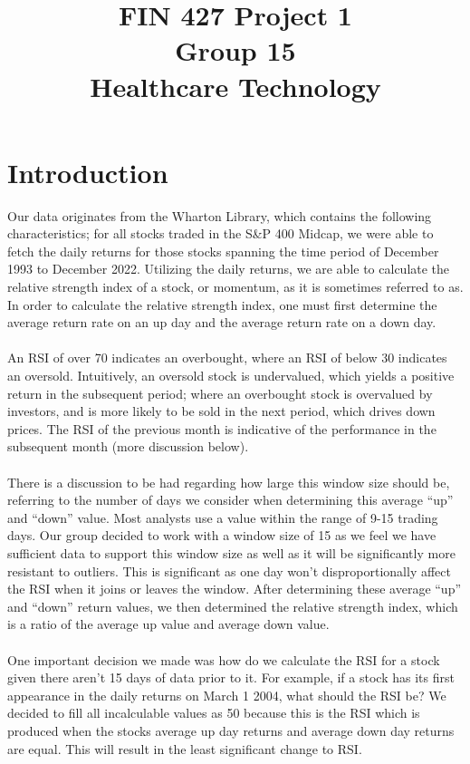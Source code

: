 \documentclass{article}
\title{\textbf{FIN 427 Project 1 \\ Group 15 \\ Healthcare Technology}}
\author{}
\begin{document}
\maketitle 
\newcommand{\sectionbreak}{\clearpage}
\tableofcontents
\section{Introduction}
Our data originates from the Wharton Library, which contains the following characteristics; for all stocks traded in the S\&P 400 Midcap, we were able to fetch the daily returns for those stocks spanning the time period of December 1993 to December 2022. Utilizing the daily returns, we are able to calculate the relative strength index of a stock, or momentum, as it is sometimes referred to as. In order to calculate the relative strength index, one must first determine the average return rate on an up day and the average return rate on a down day.  
\\~\\ An RSI of over 70 indicates an overbought, where an RSI of below 30 indicates an oversold. Intuitively, an oversold stock is undervalued, which yields a positive return in the subsequent period; where an overbought stock is overvalued by investors, and is more likely to be sold in the next period, which drives down prices. The RSI of the previous month is indicative of the performance in the subsequent month (more discussion below). 
\\~\\ There is a discussion to be had regarding how large this window size should be, referring to the number of days we consider when determining this average “up” and “down” value. Most analysts use a value within the range of 9-15 trading days. Our group decided to work with a window size of 15 as we feel we have sufficient data to support this window size as well as it will be significantly more resistant to outliers. This is significant as one day won’t disproportionally affect the RSI when it joins or leaves the window. After determining these average “up” and “down” return values, we then determined the relative strength index, which is a ratio of the average up value and average down value. 
\\~\\ One important decision we made was how do we calculate the RSI for a stock given there aren’t 15 days of data prior to it. For example, if a stock has its first appearance in the daily returns on March 1 2004, what should the RSI be? We decided to fill all incalculable values as 50 because this is the RSI which is produced when the stocks average up day returns and average down day returns are equal. This will result in the least significant change to RSI. 
\end{document}
